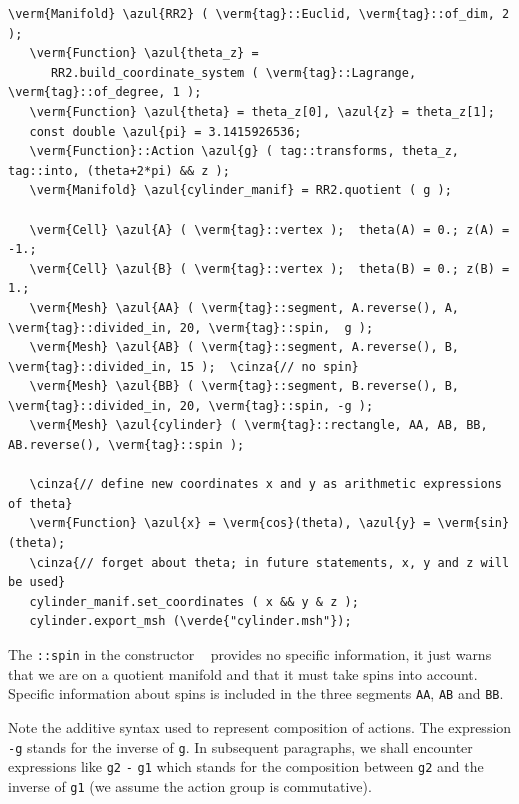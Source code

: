 \begin{Verbatim}[commandchars=\\\{\},formatcom=\small\tt,frame=single,
   label=parag-\ref{\numb section 7.\numb parag 3}.cpp,rulecolor=\color{coment},
   baselinestretch=0.94,framesep=2mm                                            ]
   \verm{Manifold} \azul{RR2} ( \verm{tag}::Euclid, \verm{tag}::of_dim, 2 );
   \verm{Function} \azul{theta_z} =
      RR2.build_coordinate_system ( \verm{tag}::Lagrange, \verm{tag}::of_degree, 1 );
   \verm{Function} \azul{theta} = theta_z[0], \azul{z} = theta_z[1];
   const double \azul{pi} = 3.1415926536;
   \verm{Function}::Action \azul{g} ( tag::transforms, theta_z, tag::into, (theta+2*pi) && z );
   \verm{Manifold} \azul{cylinder_manif} = RR2.quotient ( g );

   \verm{Cell} \azul{A} ( \verm{tag}::vertex );  theta(A) = 0.; z(A) = -1.;
   \verm{Cell} \azul{B} ( \verm{tag}::vertex );  theta(B) = 0.; z(B) =  1.;
   \verm{Mesh} \azul{AA} ( \verm{tag}::segment, A.reverse(), A, \verm{tag}::divided_in, 20, \verm{tag}::spin,  g );
   \verm{Mesh} \azul{AB} ( \verm{tag}::segment, A.reverse(), B, \verm{tag}::divided_in, 15 );  \cinza{// no spin}
   \verm{Mesh} \azul{BB} ( \verm{tag}::segment, B.reverse(), B, \verm{tag}::divided_in, 20, \verm{tag}::spin, -g );
   \verm{Mesh} \azul{cylinder} ( \verm{tag}::rectangle, AA, AB, BB, AB.reverse(), \verm{tag}::spin );

   \cinza{// define new coordinates x and y as arithmetic expressions of theta}
   \verm{Function} \azul{x} = \verm{cos}(theta), \azul{y} = \verm{sin}(theta);
   \cinza{// forget about theta; in future statements, x, y and z will be used}
   cylinder_manif.set_coordinates ( x && y & z );
   cylinder.export_msh (\verde{"cylinder.msh"});
\end{Verbatim}

The {\small\tt{}::spin} in the constructor {\small\tt{} }
provides no specific information, it just warns {\maniFEM} that we are on a quotient manifold
and that it must take spins into account.
Specific information about spins is included in the three segments {\small\tt AA}, {\small\tt AB}
and {\small\tt BB}.

Note the additive syntax used to represent composition of actions.
The expression {\small\tt -g} stands for the inverse of {\small\tt g}.
In subsequent paragraphs, we shall encounter expressions like
{\small\tt g2} {\small\tt -} {\small\tt g1} which stands for the composition between
{\small\tt g2} and the inverse of {\small\tt g1} (we assume the action group is commutative).

